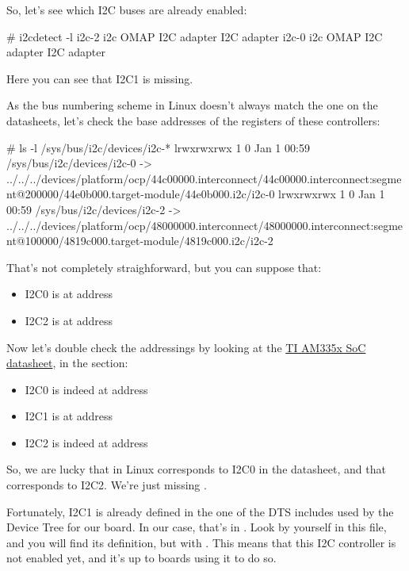 So, let's see which I2C buses are already enabled:

\begin{bashinput}
# i2cdetect -l
i2c-2	i2c             OMAP I2C adapter                        I2C adapter
i2c-0	i2c             OMAP I2C adapter                        I2C adapter
\end{bashinput}

Here you can see that I2C1 is missing.

As the bus numbering scheme in Linux doesn't always match the one
on the datasheets, let's check the base addresses of the registers
of these controllers:

\begin{bashinput}
# ls -l /sys/bus/i2c/devices/i2c-*
lrwxrwxrwx    1         0 Jan  1 00:59 /sys/bus/i2c/devices/i2c-0 -> ../../../devices/platform/ocp/44c00000.interconnect/44c00000.interconnect:segment@200000/44e0b000.target-module/44e0b000.i2c/i2c-0
lrwxrwxrwx    1         0 Jan  1 00:59 /sys/bus/i2c/devices/i2c-2 -> ../../../devices/platform/ocp/48000000.interconnect/48000000.interconnect:segment@100000/4819c000.target-module/4819c000.i2c/i2c-2
\end{bashinput}

That's not completely straighforward, but you can suppose that:
\begin{itemize}
\item I2C0 is at address 
\item I2C2 is at address 
\end{itemize}

Now let's double check the addressings by looking at the
\href{https://www.ti.com/lit/ug/spruh73q/spruh73q.pdf}{TI AM335x SoC
datasheet}, in the  section:

\begin{itemize}
\item I2C0 is indeed at address 
\item I2C1 is at address 
\item I2C2 is indeed at address 
\end{itemize}

So, we are lucky that  in Linux corresponds to I2C0 in the
datasheet, and that  corresponds to I2C2.
We're just missing .

Fortunately, I2C1 is already defined in the one of the DTS includes
used by the Device Tree for our board. In our case, that's in
. Look by yourself in this
file, and you will find its definition, but with . This means that this I2C controller is not enabled yet,
and it's up to boards using it to do so.

